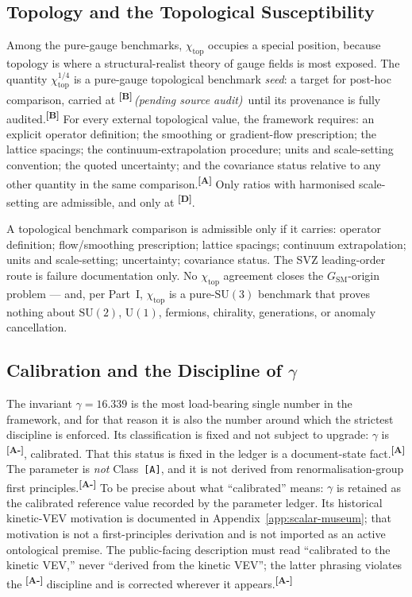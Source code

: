 \documentclass[12pt,a4paper,twoside]{article}
\theoremstyle{plain}
\theoremstyle{definition}
\theoremstyle{remark}
\newcommand{\catmark}[1]{\textsuperscript{\textsf{\textbf{[#1]}}}}
\newcommand{\Bpending}{\catmark{B}\,\textit{(pending source audit)}}
\newcommand{\GammaGeom}{16.339} %
\begin{document}
\subsection{Topology and the Topological Susceptibility}
\label{subsec:topology-chi}

Among the pure-gauge benchmarks, $\chi_{\mathrm{top}}$ occupies a
special position, because topology is where a structural-realist theory
of gauge fields is most exposed. The quantity
$\chi_{\mathrm{top}}^{1/4}$ is a pure-gauge topological benchmark
\emph{seed}: a target for post-hoc comparison, carried at \Bpending\
until its provenance is fully audited.\catmark{B} For every external
topological value, the framework requires: an explicit operator
definition; the smoothing or gradient-flow prescription; the lattice
spacings; the continuum-extrapolation procedure; units and scale-setting
convention; the quoted uncertainty; and the covariance status relative
to any other quantity in the same comparison.\catmark{A} Only ratios
with harmonised scale-setting are admissible, and only at \catmark{D}.

\begin{governancebox}
A topological benchmark comparison is admissible only if it carries:
operator definition; flow/smoothing prescription; lattice spacings;
continuum extrapolation; units and scale-setting; uncertainty;
covariance status. The SVZ leading-order route is failure documentation
only. No $\chi_{\mathrm{top}}$ agreement closes the
$G_{\mathrm{SM}}$-origin problem --- and, per Part~I, $\chi_{\mathrm{top}}$
is a pure-$\mathrm{SU}(3)$ benchmark that proves nothing about
$\mathrm{SU}(2)$, $\mathrm{U}(1)$, fermions, chirality, generations, or
anomaly cancellation.
\end{governancebox}

\subsection{Calibration and the Discipline of \texorpdfstring{$\gamma$}{gamma}}
\label{subsec:gamma-discipline}

The invariant $\gamma = \GammaGeom$ is the most load-bearing single
number in the framework, and for that reason it is also the number
around which the strictest discipline is enforced. Its classification is
fixed and not subject to upgrade: $\gamma$ is \catmark{A-}, calibrated.
That this status is fixed in the ledger is a document-state fact.\catmark{A}
The parameter is \emph{not} Class~\texttt{[A]}, and it is not derived from
renormalisation-group first principles.\catmark{A-} To be precise about
what ``calibrated'' means: $\gamma$ is retained as the calibrated reference value recorded by the parameter ledger.
Its historical kinetic-VEV motivation is documented in Appendix~\ref{app:scalar-museum};
that motivation is not a first-principles derivation and is not imported as
an active ontological premise. The public-facing
description must read ``calibrated to the kinetic VEV,'' never ``derived
from the kinetic VEV''; the latter phrasing violates the \catmark{A-}
discipline and is corrected wherever it appears.\catmark{A-}
\end{document}

